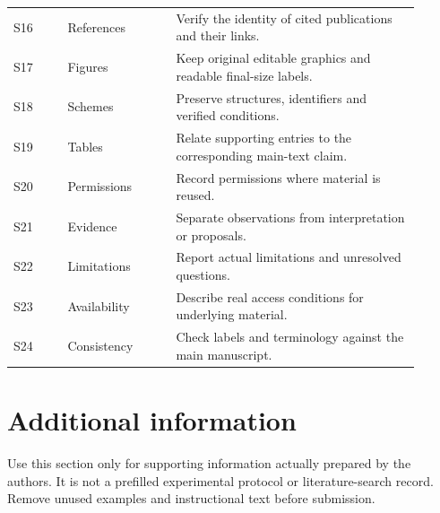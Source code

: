 \documentclass[a4paper,11pt]{article}
\begin{document}
\begin{longtable}{@{}p{0.12\linewidth}p{0.24\linewidth}p{0.54\linewidth}@{}}
S16 & References & Verify the identity of cited publications and their links.\\
S17 & Figures & Keep original editable graphics and readable final-size labels.\\
S18 & Schemes & Preserve structures, identifiers and verified conditions.\\
S19 & Tables & Relate supporting entries to the corresponding main-text claim.\\
S20 & Permissions & Record permissions where material is reused.\\
S21 & Evidence & Separate observations from interpretation or proposals.\\
S22 & Limitations & Report actual limitations and unresolved questions.\\
S23 & Availability & Describe real access conditions for underlying material.\\
S24 & Consistency & Check labels and terminology against the main manuscript.\\
\end{longtable}
\endgroup

\section{Additional information}\label{sec:si-additional}
Use this section only for supporting information actually prepared by the
authors. It is not a prefilled experimental protocol or literature-search
record. Remove unused examples and instructional text before submission.



\end{document}
